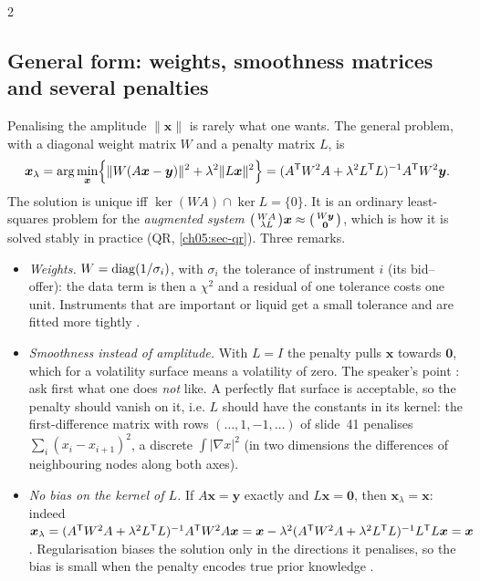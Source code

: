 \begin{paracol}{2}
\subsection{General form: weights, smoothness matrices and several penalties}\label{ch20:sec-general}
Penalising the amplitude $\|\bm x\|$ is rarely what one wants. The general problem, with a diagonal weight matrix $W$ and a penalty matrix $L$, is
\begin{equation}\label{ch20:eq-gen}
  \bm x_\lambda=\arg\min_{\bm x}\Bigl\{\|W(A\bm x-\bm y)\|^2+\lambda^2\|L\bm x\|^2\Bigr\}=(A^{\mathsf T} W^2A+\lambda^2L^{\mathsf T} L)^{-1}A^{\mathsf T} W^2\bm y .
\end{equation}
The solution is unique iff $\ker(WA)\cap\ker L=\{0\}$. It is an ordinary least-squares problem for the \emph{augmented system}
$\begin{psmallmatrix}WA\\ \lambda L\end{psmallmatrix}\bm x\approx\begin{psmallmatrix}W\bm y\\ \bm 0\end{psmallmatrix}$, which is how it is solved stably in practice (QR, \cref{ch05:sec-qr}). Three remarks.
\begin{itemize}
  \item \emph{Weights.} $W=\operatorname{diag}(1/\sigma_i)$, with $\sigma_i$ the tolerance of instrument $i$ (its bid--offer): the data term is then a $\chi^2$ and a residual of one tolerance costs one unit. Instruments that are
        important or liquid get a small tolerance and are fitted more tightly .
  \item \emph{Smoothness instead of amplitude.} With $L=I$ the penalty pulls $\bm x$ towards $\bm 0$, which for a volatility surface means a volatility of zero. The speaker's point : ask first what one does \emph{not} like. A perfectly flat
        surface is acceptable, so the penalty should vanish on it, i.e. $L$ should have the constants in its kernel: the first-difference matrix with rows $(\dots,1,-1,\dots)$ of slide~41 penalises $\sum_i(x_i-x_{i+1})^2$, a discrete $\int|\nabla x|^2$ (in two dimensions the differences of neighbouring nodes along both axes).
  \item \emph{No bias on the kernel of $L$.} If $A\bm x=\bm y$ exactly and $L\bm x=\bm 0$, then $\bm x_\lambda=\bm x$: indeed $\bm x_\lambda=(A^{\mathsf T} W^2A+\lambda^2L^{\mathsf T} L)^{-1}A^{\mathsf T} W^2A\bm x=\bm x-\lambda^2(A^{\mathsf T} W^2A+\lambda^2L^{\mathsf T} L)^{-1}L^{\mathsf T} L\bm x=\bm x$.
        Regularisation biases the solution only in the directions it penalises, so the bias is small when the penalty encodes true prior knowledge .

\end{itemize}
\end{paracol}
